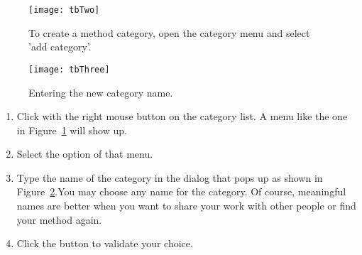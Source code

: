 \begin{figure}
\centerline{\texttt{[image: tbTwo]}} 
\caption{To create a method category, \newcommand{\replace}[2]{in}{open} the category menu\newcommand{\replace}[2]{,}{ and} select 'add category'.\label{fig:categoryMenu}}
\end{figure}
\begin{figure}\label{fig:categoryPrompt}
\centerline{\texttt{[image: tbThree]}}
 \caption{Entering the new category name.}
\end{figure}
\begin{enumerate}
\item Click with the right mouse button on the category list.
A menu \newcommand{\replace}[2]{such as}{like} the one \newcommand{\replace}[2]{of}{in} Figure~\ref{fig:categoryMenu} will show up.
\item Select the option  of that menu.
\item Type the name of the category in the dialog that pops up 
as shown in Figure~\ref{fig:categoryPrompt}.You may choose any name for the category. Of course, meaningful names are better \newcommand{\replace}[2]{if}{when} you want to share your work with other people\newcommand{\add}[1]{,} or find
your \newcommand{\replace}[2]{way quickly}{method again}. 
\item Click \newcommand{\remove}[1]{into} the  button to validate your  choice.
\end{enumerate}


